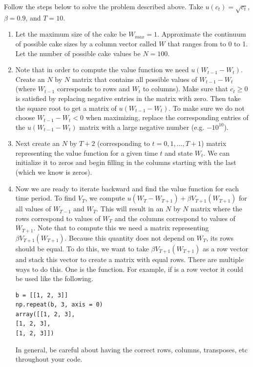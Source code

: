 \begin{problem}
\label{prob:cake_prob}
Follow the steps below to solve the problem described above.  Take $u(c_t) = \sqrt{c_t}$, $\beta = 0.9$, and $T=10$.
\begin{enumerate}
\item Let the maximum size of the cake be $W_{max} = 1$. Approximate the continuum of possible cake sizes by a column vector called $W$ that ranges from to 0 to 1.  Let the number of possible cake values be $N=100$.

\item Note that in order to compute the value function we need $u(W_{t-1}-W_t)$.  Create an $N$ by $N$ matrix that contains all possible values of $W_{t-1} - W_t$ (where $W_{t-1}$ corresponds to rows and $W_{t}$ to columns).  Make sure that $c_t \geq 0$ is satisfied by replacing negative entries in the matrix with zero.  Then take the square root to get a matrix of $u(W_{t-1}-W_t)$.  To make sure we do not choose $W_{t-1} - W_t < 0$ when maximizing, replace the corresponding entries of the $u(W_{t-1}-W_t)$ matrix with a large negative number (e.g. $-10^{10}$).

\item Next create an $N$ by $T+2$ (corresponding to $t=0,1,\ldots, T+1$) matrix representing the value function for a given time $t$ and state $W_t$.  We can initialize it to zeros and begin filling in the columns starting with the last (which we know is zeros).

\item Now we are ready to iterate backward and find the value function for each time period.  To find $V_T$, we compute $u(W_T - W_{T+1}) + \beta V_{T+1}(W_{T+1})$ for all values of $W_{T-1}$ and $W_T$.  This will result in an $N$ by $N$ matrix where the rows correspond to values of $W_{T}$ and the columns correspond to values of $W_{T+1}$.  Note that to compute this we need a matrix representing $\beta V_{T+1}(W_{T+1})$.  Because this quantity does not depend on $W_T$, its rows should be equal.  To do this, we want to take $\beta V_{T+1}(W_{T+1})$ as a row vector and stack this vector to create a matrix with equal rows.  There are multiple ways to do this.  One is the  function.  For example, if  is a row vector it could be used like the following.
\begin{lstlisting}
b = [[1, 2, 3]]
np.repeat(b, 3, axis = 0)
array([[1, 2, 3],
[1, 2, 3],
[1, 2, 3]])
\end{lstlisting}
In general, be careful about having the correct rows, columns, transposes, etc throughout your code. 


\end{enumerate}
\end{problem}
